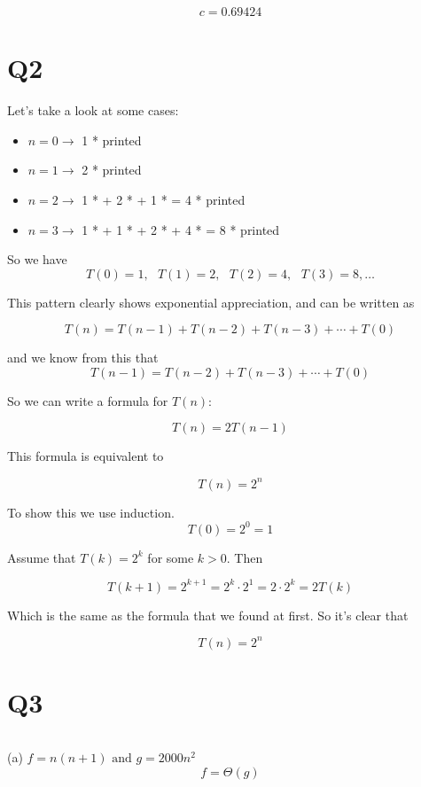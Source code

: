 \documentclass[12pt]{article}
\begin{document}
$$c = 0.69424$$



\bigskip

\section*{Q2}

Let's take a look at some cases:

\begin{itemize}
\item $n = 0 \rightarrow$ 1 * printed
\item $n = 1 \rightarrow$ 2 * printed
\item $n = 2 \rightarrow$ 1 * + 2 * + 1 * = 4 * printed
\item $n = 3 \rightarrow$ 1 * + 1 * + 2 * + 4 * = 8 * printed
\end{itemize}

So we have $$T(0) = 1, \text{ } T(1) = 2, \text{ }  T(2) = 4, \text{ }  T(3) = 8, \dots$$

This pattern clearly shows exponential appreciation, and can be written as 

$$T(n) = T(n-1) + T(n-2) + T(n-3) + \cdots + T(0)$$

and we know from this that $$T(n-1) = T(n-2) + T(n-3) + \cdots + T(0)$$

So we can write a formula for $T(n)$:

$$T(n) = 2 T(n-1)$$

This formula is equivalent to 

$$T(n) = 2^n$$

To show this we use induction. $$T(0) = 2^0 = 1$$

Assume that $T(k) = 2^k$ for some $k > 0$. Then

$$T(k+1) = 2^{k+1} = 2^{k} \cdot 2^1 = 2 \cdot 2^k = 2 T(k)$$

Which is the same as the formula that we found at first. So it's clear that

$$T(n) = 2^n$$




\bigskip
\section*{Q3}
$$$$

(a) $f = n(n+1) \text{ and } g = 2000n^2$ $$f = \Theta(g)$$
\end{document}
